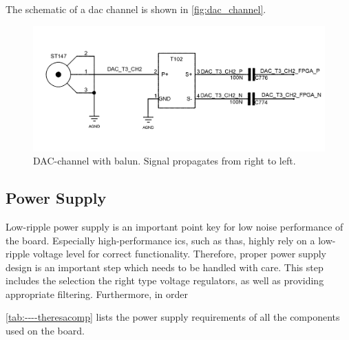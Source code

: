 The schematic of a \gls{dac} channel is shown in \autoref{fig:dac_channel}.
\begin{figure}[tbh]
	\centering
	\includegraphics[width = \textwidth]{chap/04-theresa/img/schematic/dac_channel}
	\caption{DAC-channel with balun. Signal propagates from right to left.}
	\label{fig:dac_channel}
\end{figure}


\subsection{Power Supply}
Low-ripple power supply is an important point key for low noise performance of the board. Especially high-performance \Glspl{ic}, such as \glspl{tha}, highly rely on a low-ripple voltage level for correct functionality. 
Therefore, proper power supply design is an important step which needs to be handled with care.
This step includes the selection the right type voltage regulators, as well as providing appropriate filtering. 
Furthermore, in order 

\autoref{tab:----theresacomp} lists the power supply requirements of all the components used on the board.


